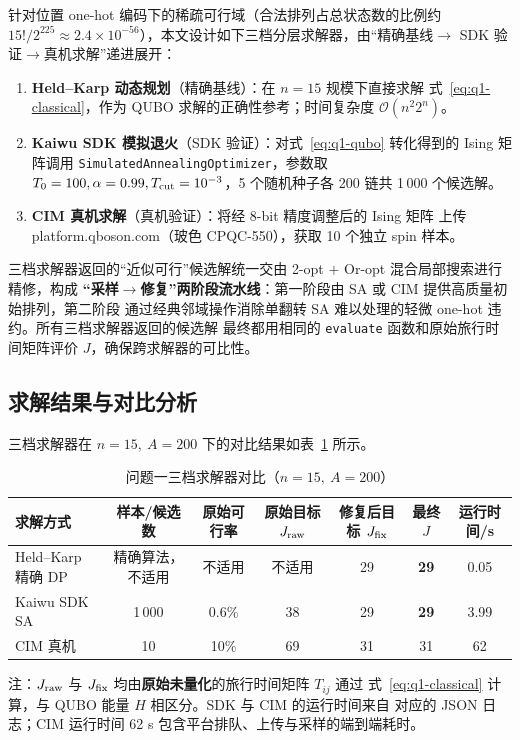 \documentclass[UTF8,12pt,a4paper]{ctexart}
\begin{document}
针对位置 one-hot 编码下的稀疏可行域（合法排列占总状态数的比例约
$15!/2^{225}\!\approx\!2.4\times 10^{-56}$），本文设计如下三档分层求解器，由``精确基线$\to$
SDK 验证$\to$真机求解''递进展开：
\begin{enumerate}
  \item[(i)] \textbf{Held--Karp 动态规划}（精确基线）：在 $n=15$ 规模下直接求解
    式~\eqref{eq:q1-classical}，作为 QUBO 求解的正确性参考；时间复杂度 $\mathcal{O}(n^{2}2^{n})$。
  \item[(ii)] \textbf{Kaiwu SDK 模拟退火}（SDK 验证）：对式~\eqref{eq:q1-qubo} 转化得到的
    Ising 矩阵调用 \texttt{SimulatedAnnealingOptimizer}，参数取 $T_{0}=100,\alpha=0.99,
    T_{\rm cut}=10^{-3}$，5 个随机种子各 200 链共 1\,000 个候选解。
  \item[(iii)] \textbf{CIM 真机求解}（真机验证）：将经 8-bit 精度调整后的 Ising 矩阵
    上传 platform.qboson.com（玻色 CPQC-550），获取 10 个独立 spin 样本。
\end{enumerate}
三档求解器返回的``近似可行''候选解统一交由 2-opt $+$ Or-opt 混合局部搜索进行精修，构成
\textbf{``采样$\to$修复''两阶段流水线}：第一阶段由 SA 或 CIM 提供高质量初始排列，第二阶段
通过经典邻域操作消除单翻转 SA 难以处理的轻微 one-hot 违约。所有三档求解器返回的候选解
最终都用相同的 \texttt{evaluate} 函数和原始旅行时间矩阵评价 $J$，确保跨求解器的可比性。

\subsection{求解结果与对比分析}
\label{subsec:q1-result}

三档求解器在 $n=15,\ A=200$ 下的对比结果如表~\ref{tab:q1-cmp} 所示。

\begin{table}[H]
  \centering
  \caption{问题一三档求解器对比（$n=15,\ A=200$）}
  \label{tab:q1-cmp}
  \footnotesize
  \begin{tabular}{lcccccc}
    \toprule
    求解方式 & 样本/候选数 & 原始可行率 & 原始目标 $J_{\rm raw}$ & 修复后目标 $J_{\rm fix}$ & 最终 $J$ & 运行时间/s \\
    \midrule
    Held--Karp 精确 DP & 精确算法，不适用 & 不适用 & 不适用 & 29 & \textbf{29} & 0.05 \\
    Kaiwu SDK SA      & 1\,000 & 0.6\% & 38 & 29 & \textbf{29} & 3.99 \\
    CIM 真机          & 10    & 10\%  & 69 & 31 & 31         & 62 \\
    \bottomrule
  \end{tabular}
  \begin{flushleft}\footnotesize
  注：$J_{\rm raw}$ 与 $J_{\rm fix}$ 均由\textbf{原始未量化}的旅行时间矩阵 $T_{ij}$ 通过
  式~\eqref{eq:q1-classical} 计算，与 QUBO 能量 $H$ 相区分。SDK 与 CIM 的运行时间来自
  对应的 JSON 日志；CIM 运行时间 62 s 包含平台排队、上传与采样的端到端耗时。
  \end{flushleft}
\end{table}
\end{document}
